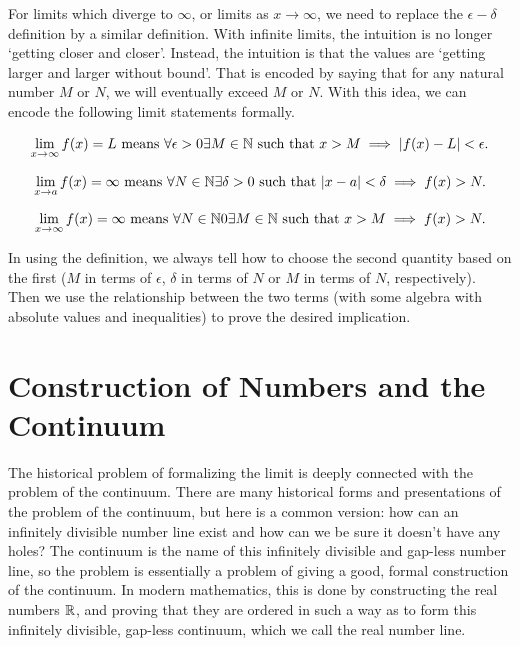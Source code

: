 \documentclass[fleqn]{report}
\begin{document}
For limits which diverge to $\infty$, or limits as $x
\rightarrow \infty$, we need to replace the $\epsilon-\delta$
definition by a similar definition. With infinite limits, the
intuition is no longer `getting closer and closer'. Instead,
the intuition is that the values are `getting larger and
larger without bound'. That is encoded by saying that for
any natural number $M$ or $N$, we will eventually exceed $M$
or $N$. With this idea, we can encode the following limit
statements formally.

\begin{defn}
\begin{equation*}
\lim_{x \rightarrow \infty} f(x) = L \text{ means } 
\forall \epsilon > 0 \exists M \in \mathbb{N} \text{ such that } x >
M \implies |f(x) - L| < \epsilon.
\end{equation*}
\end{defn}

\begin{defn}
\begin{equation*}
\lim_{x \rightarrow a} f(x) = \infty \text{ means }
\forall N \in \mathbb{N} \exists \delta > 0 \text{ such that } |x-a|
< \delta \implies f(x) > N.
\end{equation*}
\end{defn}

\begin{defn}
\begin{equation*}
\lim_{x \rightarrow \infty} f(x) = \infty \text{ means }
\forall N \in \mathbb{N} 0 \exists M \in \mathbb{N} \text{ such that } x >
M \implies f(x) > N.
\end{equation*}
\end{defn}

In using the definition, we always tell how to choose the
second quantity based on the first ($M$ in terms of
$\epsilon$, $\delta$ in terms of $N$ or $M$ in terms of $N$,
respectively). Then we use the relationship between the two
terms (with some algebra with absolute values and inequalities)
to prove the desired implication.

\section{Construction of Numbers and the Continuum}
\label{construction-of-numbers}

The historical problem of formalizing the limit is deeply
connected with the problem of the continuum. There are many
historical forms and presentations of the problem of the
continuum, but here is a common version: how can
an infinitely divisible number line exist and how can we be
sure it doesn't have any holes? The continuum is the name of
this infinitely divisible and gap-less number line, so the
problem is essentially a problem of giving a good, formal
construction of the continuum. In modern mathematics, this is
done by constructing the real numbers $\mathbb{R}$, and proving that
they are ordered in such a way as to form this infinitely
divisible, gap-less continuum, which we call the real number
line.
\end{document}

